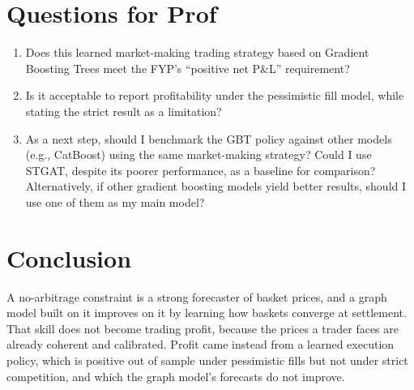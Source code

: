 \documentclass[11pt,a4paper]{article}
\begin{document}
\section{Questions for Prof}

\begin{enumerate}
    \item Does this learned market-making trading strategy based on Gradient Boosting Trees meet the FYP's ``positive net P\&L'' requirement?

    \item Is it acceptable to report profitability under the pessimistic fill model, while stating the strict result as a limitation?

    \item As a next step, should I benchmark the GBT policy against other models (e.g., CatBoost) using the same market-making strategy? Could I use STGAT, despite its poorer performance, as a baseline for comparison? Alternatively, if other gradient boosting models yield better results, should I use one of them as my main model?
\end{enumerate}

\section{Conclusion}
A no-arbitrage constraint is a strong forecaster of basket prices, and a graph model built on it improves on it by
learning how baskets converge at settlement. That skill does not become trading profit, because the prices a trader
faces are already coherent and calibrated. Profit came instead from a learned execution policy, which is positive out
of sample under pessimistic fills but not under strict competition, and which the graph model's forecasts do not
improve.
\end{document}
